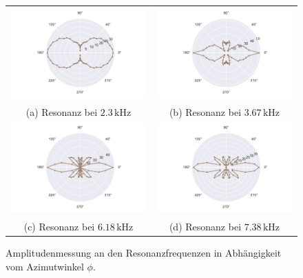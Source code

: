 \begin{figure}
    \centering
    \begin{tabular}{cc}
      \includegraphics[width=65mm]{Daten/Wasserstoff/peak0.pdf} &   \includegraphics[width=65mm]{Daten/Wasserstoff/peak1.pdf} \\
    (a) Resonanz bei $2.3 \,\si{\kilo\hertz} $& (b) Resonanz bei $3.67 \,\si{\kilo\hertz}$ \\[6pt]
    \includegraphics[width=65mm]{Daten/Wasserstoff/peak2.pdf} &   \includegraphics[width=65mm]{Daten/Wasserstoff/peak3.pdf} \\
    (c) Resonanz bei $6.18 \,\si{\kilo\hertz}$ & (d) Resonanz bei $7.38 \,\si{\kilo\hertz}$ \\[6pt]
    \end{tabular}
    \caption{Amplitudenmessung an den Resonanzfrequenzen in Abhängigkeit vom Azimutwinkel $\phi$. } 
    \label{fig:hpeaks}
\end{figure}

